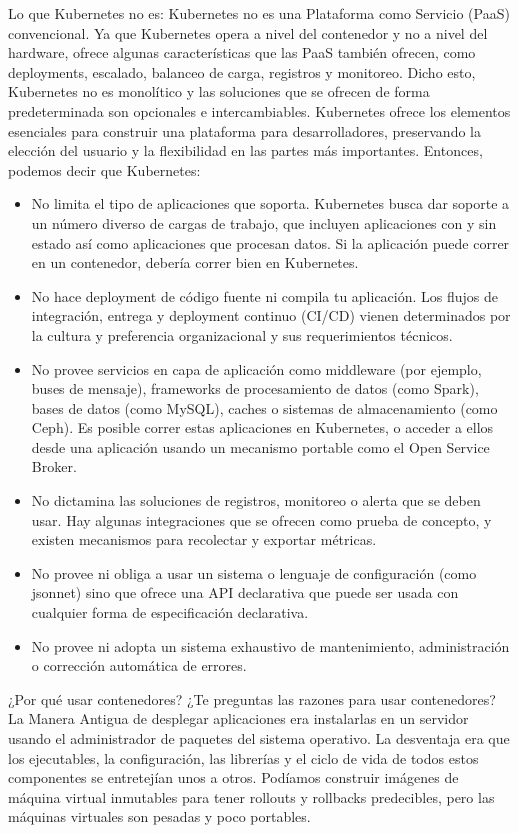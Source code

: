 \documentclass[12pt]{article}
\begin{document}
Lo que Kubernetes no es:
Kubernetes no es una Plataforma como Servicio (PaaS) convencional. Ya que Kubernetes opera a nivel del contenedor y no a nivel del hardware, ofrece algunas características que las PaaS también ofrecen, como deployments, escalado, balanceo de carga, registros y monitoreo. Dicho esto, Kubernetes no es monolítico y las soluciones que se ofrecen de forma predeterminada son opcionales e intercambiables.
Kubernetes ofrece los elementos esenciales para construir una plataforma para desarrolladores, preservando la elección del usuario y la flexibilidad en las partes más importantes.
Entonces, podemos decir que Kubernetes:
\begin{itemize}
\item No limita el tipo de aplicaciones que soporta. Kubernetes busca dar soporte a un número diverso de cargas de trabajo, que incluyen aplicaciones con y sin estado así como aplicaciones que procesan datos. Si la aplicación puede correr en un contenedor, debería correr bien en Kubernetes.
\item No hace deployment de código fuente ni compila tu aplicación. Los flujos de integración, entrega y deployment continuo (CI/CD) vienen determinados por la cultura y preferencia organizacional y sus requerimientos técnicos.
\item No provee servicios en capa de aplicación como middleware (por ejemplo, buses de mensaje), frameworks de procesamiento de datos (como Spark), bases de datos (como MySQL), caches o sistemas de almacenamiento (como Ceph). Es posible correr estas aplicaciones en Kubernetes, o acceder a ellos desde una aplicación usando un mecanismo portable como el Open Service Broker.
\item No dictamina las soluciones de registros, monitoreo o alerta que se deben usar. Hay algunas integraciones que se ofrecen como prueba de concepto, y existen mecanismos para recolectar y exportar métricas.
\item No provee ni obliga a usar un sistema o lenguaje de configuración (como jsonnet) sino que ofrece una API declarativa que puede ser usada con cualquier forma de especificación declarativa.
\item No provee ni adopta un sistema exhaustivo de mantenimiento, administración o corrección automática de errores.
\end{itemize}
¿Por qué usar contenedores?
¿Te preguntas las razones para usar contenedores?
La Manera Antigua de desplegar aplicaciones era instalarlas en un servidor usando el administrador de paquetes del sistema operativo. La desventaja era que los ejecutables, la configuración, las librerías y el ciclo de vida de todos estos componentes se entretejían unos a otros. Podíamos construir imágenes de máquina virtual inmutables para tener rollouts y rollbacks predecibles, pero las máquinas virtuales son pesadas y poco portables.
\end{document}
